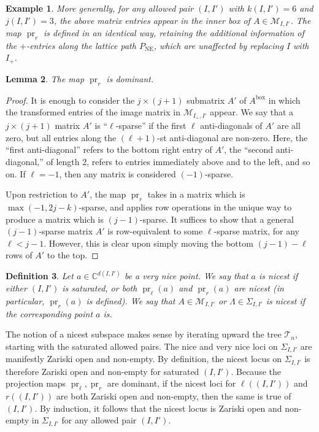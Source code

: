 \documentclass[12pt]{amsart}
\newtheorem{definition}{Definition}[subsection]
\newtheorem{example}[definition]{Example}
\newtheorem{lemma}[definition]{Lemma}
\DeclareMathOperator{\inbox}{box}
\DeclareMathOperator{\NE}{NE}
\DeclareMathOperator{\pr}{pr}
\newcommand{\bC}{\mathbb{C}}
\newcommand{\cM}{\mathcal{M}}
\newcommand{\cT}{\mathcal{T}}
\begin{document}
\begin{example}
More generally, for any allowed pair $(I,I')$ with $k(I,I')=6$ and $j(I,I')=3$, the above matrix entries appear in the inner box of $A\in\cM_{I,I'}$. The map $\pr_r$ is defined in an identical way, retaining the additional information of the $+$-entries along the lattice path $P_{\NE}$, which are unaffected by replacing $I$ with $I_+$.
\end{example}

\begin{lemma}\label{lem:pr_r_is_dominant}
    The map $\pr_r$ is dominant.
\end{lemma}

\begin{proof}
It is enough to consider the $j\times (j+1)$ submatrix $A'$ of $A^{\inbox}$ in which the transformed entries of the image matrix in $\cM_{I_+,I'}$ appear. We say that a $j\times (j+1)$ matrix $A'$ is ``$\ell$-sparse'' if the first $\ell$ anti-diagonals of $A'$ are all zero, but all entries along the $(\ell+1)$-st anti-diagonal are non-zero. Here, the ``first anti-diagonal'' refers to the bottom right entry of $A'$, the ``second anti-diagonal,'' of length 2, refers to entries immediately above and to the left, and so on. If $\ell=-1$, then any matrix is considered $(-1)$-sparse.

Upon restriction to $A'$, the map $\pr_r$ takes in a matrix which is $\max(-1,2j-k)$-sparse, and applies row operations in the unique way to produce a matrix which is $(j-1)$-sparse. It suffices to show that a general $(j-1)$-sparse matrix $A'$ is row-equivalent to some $\ell$-sparse matrix, for any $\ell<j-1$. However, this is clear upon simply moving the bottom $(j-1)-\ell$ rows of $A'$ to the top.
\end{proof}

\begin{definition}\label{def:nicest}
Let $a\in\bC^{d(I,I')}$ be a very nice point. We say that $a$ is \emph{nicest} if either $(I,I')$ is saturated, or both $\pr_\ell(a)$ and $\pr_r(a)$ are nicest (in particular, $\pr_r(a)$ is defined). We say that $A\in\cM_{I,I'}$ or $\Lambda\in\Sigma_{I,I'}$ is nicest if the corresponding point $a$ is.
\end{definition}

The notion of a nicest subspace makes sense by iterating upward the tree $\cT_n$, starting with the saturated allowed pairs. The nice and very nice loci on $\Sigma_{I,I'}$ are manifestly Zariski open and non-empty. By definition, the nicest locus on $\Sigma_{I,I'}$ is therefore Zariski open and non-empty for saturated $(I,I')$. Because the projection maps $\pr_\ell,\pr_r$ are dominant, if the nicest loci for $\ell((I,I'))$ and $r((I,I'))$ are both Zariski open and non-empty, then the same is true of $(I,I')$. By induction, it follows that the nicest locus is Zariski open and non-empty in $\Sigma_{I,I'}$ for any allowed pair $(I,I')$. 
\end{document}
